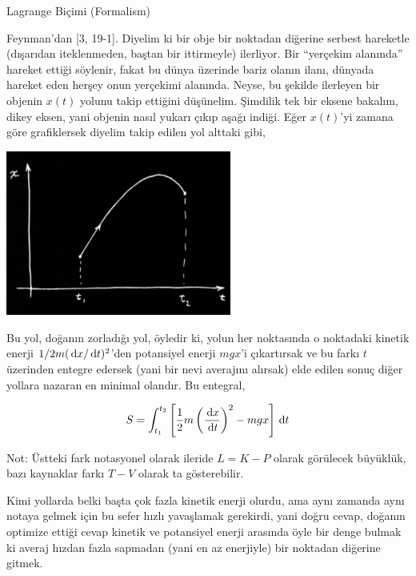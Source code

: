 \documentclass[12pt,fleqn]{article}\usepackage{../../common}
\begin{document}
Lagrange Biçimi (Formalism)

Feynman'dan [3, 19-1].  Diyelim ki bir obje bir noktadan diğerine serbest
hareketle (dışarıdan iteklenmeden, baştan bir ittirmeyle) ilerliyor. Bir
``yerçekim alanında'' hareket ettiği söylenir, fakat bu dünya üzerinde
bariz olanın ilanı, dünyada hareket eden herşey onun yerçekimi
alanında. Neyse, bu şekilde ilerleyen bir objenin $x(t)$ yolunu takip
ettiğini düşünelim. Şimdilik tek bir eksene bakalım, dikey eksen, yani
objenin nasıl yukarı çıkıp aşağı indiği. Eğer $x(t)$'yi zamana göre
grafiklersek diyelim takip edilen yol alttaki gibi,

\includegraphics[width=20em]{phy_lagrange_04.png}

Bu yol, doğanın zorladığı yol, öyledir ki, yolun her noktasında o noktadaki
kinetik enerji $1/2 m(\,\mathrm{d} x/\,\mathrm{d} t)^2$'den potansiyel enerji $mgx$'i
çıkartırsak ve bu farkı $t$ üzerinden entegre edersek (yani bir nevi
averajını alırsak) elde edilen sonuç diğer yollara nazaran en minimal
olandır. Bu entegral,

$$ 
S = \int_{t_1}^{t_2} 
\left[ 
\frac{1}{2} m \left( \frac{\,\mathrm{d} x}{\,\mathrm{d} t} \right)^2 - mgx 
\right] \,\mathrm{d} t
$$

Not: Üstteki fark notasyonel olarak ileride $L = K - P$ olarak görülecek
büyüklük, bazı kaynaklar farkı $T - V$ olarak ta gösterebilir.

Kimi yollarda belki başta çok fazla kinetik enerji olurdu, ama aynı zamanda
aynı notaya gelmek için bu sefer hızlı yavaşlamak gerekirdi, yani doğru
cevap, doğanın optimize ettiği cevap kinetik ve potansiyel enerji arasında
öyle bir denge bulmak ki averaj hızdan fazla sapmadan (yani en az
enerjiyle) bir noktadan diğerine gitmek. 
\end{document}
